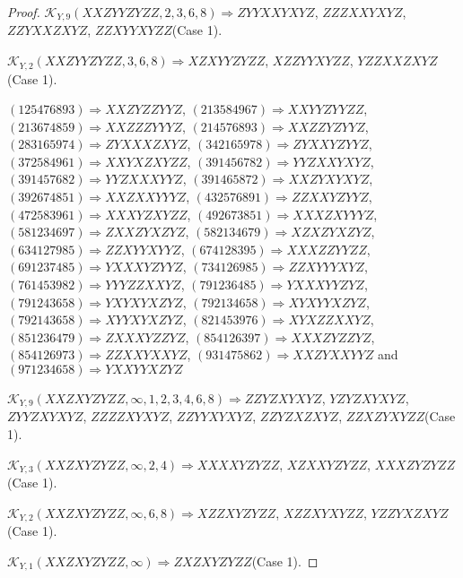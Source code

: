 \documentclass[12pt]{article}
\theoremstyle{plain}
\theoremstyle{definition}
\theoremstyle{remark}
\newcommand{\fancy}[1]{\mathcal{#1}}
\def\K{\fancy{K}}
\begin{document}
\begin{proof}
	
	$\K_{Y,9}(XXZYYZYZZ,2, 3, 6, 8)\Rightarrow $$ZYYXXYXYZ$, $ZZZXXYXYZ$, $ZZYXXZXYZ$, $ZZXYYXYZZ$(Case 1).
	
	$\K_{Y,2}(XXZYYZYZZ,3, 6, 8)\Rightarrow $$XZXYYZYZZ$, $XZZYYXYZZ$, $YZZXXZXYZ$(Case 1).
	
	
	
	$(1 2 5 4 7 6 8 9 3)\Rightarrow XXZYZZYYZ$, $(2 1 3 5 8 4 9 6 7)\Rightarrow XXYYZYYZZ$, $(2 1 3 6 7 4 8 5 9)\Rightarrow XXZZZYYYZ$, $(2 1 4 5 7 6 8 9 3)\Rightarrow XXZZYZYYZ$, $(2 8 3 1 6 5 9 7 4)\Rightarrow ZYXXXZXYZ$, $(3 4 2 1 6 5 9 7 8)\Rightarrow ZYXXYZYYZ$, $(3 7 2 5 8 4 9 6 1)\Rightarrow XXYXZXYZZ$, $(3 9 1 4 5 6 7 8 2)\Rightarrow YYZXXYXYZ$, $(3 9 1 4 5 7 6 8 2)\Rightarrow YYZXXXYYZ$, $(3 9 1 4 6 5 8 7 2)\Rightarrow XXZYXYXYZ$, $(3 9 2 6 7 4 8 5 1)\Rightarrow XXZXXYYYZ$, $(4 3 2 5 7 6 8 9 1)\Rightarrow ZZXXYZYYZ$, $(4 7 2 5 8 3 9 6 1)\Rightarrow XXXYZXYZZ$, $(4 9 2 6 7 3 8 5 1)\Rightarrow XXXZXYYYZ$, $(5 8 1 2 3 4 6 9 7)\Rightarrow ZXXZYXZYZ$, $(5 8 2 1 3 4 6 7 9)\Rightarrow XZXZYXZYZ$, $(6 3 4 1 2 7 9 8 5)\Rightarrow ZZXYYXYYZ$, $(6 7 4 1 2 8 3 9 5)\Rightarrow XXXZZYYZZ$, $(6 9 1 2 3 7 4 8 5)\Rightarrow YXXXYZYYZ$, $(7 3 4 1 2 6 9 8 5)\Rightarrow ZZXYYYXYZ$, $(7 6 1 4 5 3 9 8 2)\Rightarrow YYYZZXXYZ$, $(7 9 1 2 3 6 4 8 5)\Rightarrow YXXXYYZYZ$, $(7 9 1 2 4 3 6 5 8)\Rightarrow YXYXYXZYZ$, $(7 9 2 1 3 4 6 5 8)\Rightarrow XYXYYXZYZ$, $(7 9 2 1 4 3 6 5 8)\Rightarrow XYYXYXZYZ$, $(8 2 1 4 5 3 9 7 6)\Rightarrow XYXZZXXYZ$, $(8 5 1 2 3 6 4 7 9)\Rightarrow ZXXXYZZYZ$, $(8 5 4 1 2 6 3 9 7)\Rightarrow XXXZYZZYZ$, $(8 5 4 1 2 6 9 7 3)\Rightarrow ZZXXYXXYZ$, $(9 3 1 4 7 5 8 6 2)\Rightarrow XXZYXXYYZ$ and $(9 7 1 2 3 4 6 5 8)\Rightarrow YXXYYXZYZ$
	
	
	$\K_{Y,9}(XXZXYZYZZ,\infty,1, 2, 3, 4, 6, 8)\Rightarrow $$ZZYZXYXYZ$, $YZYZXYXYZ$, $ZYYZXYXYZ$, $ZZZZXYXYZ$, $ZZYYXYXYZ$, $ZZYZXZXYZ$, $ZZXZYXYZZ$(Case 1).
	
	$\K_{Y,3}(XXZXYZYZZ,\infty,2, 4)\Rightarrow $$XXXXYZYZZ$, $XZXXYZYZZ$, $XXXZYZYZZ$(Case 1).
	
	$\K_{Y,2}(XXZXYZYZZ,\infty,6, 8)\Rightarrow $$XZZXYZYZZ$, $XZZXYXYZZ$, $YZZYXZXYZ$(Case 1).
	
	$\K_{Y,1}(XXZXYZYZZ,\infty)\Rightarrow $$ZXZXYZYZZ$(Case 1).
	
	
	

\end{proof}
\end{document}

